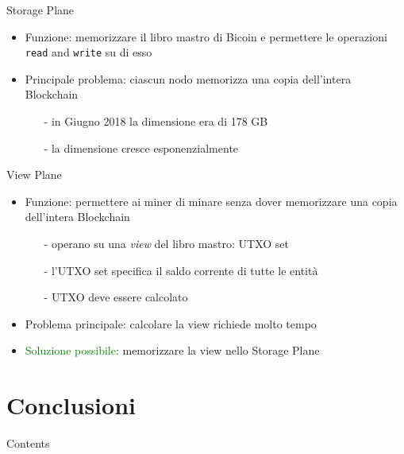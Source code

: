 \documentclass{beamer}
\begin{document}
  
  
  
  \begin{frame}{Storage Plane}
      \begin{itemize}
          \item Funzione: memorizzare il libro mastro di Bicoin e permettere le operazioni \texttt{read} and \texttt{write} su di esso
          \item Principale problema: ciascun nodo memorizza una copia dell'intera Blockchain
          \begin{itemize}
              \item[-] in Giugno 2018 la dimensione era di 178 GB \cite{statista}
              \item[-] la dimensione cresce esponenzialmente
          \end{itemize}
      \end{itemize}
  \end{frame}
  
  
  
  
  \begin{frame}{View Plane}
      \begin{itemize}
          \item Funzione: permettere ai miner di minare senza dover memorizzare una copia dell'intera Blockchain
          \begin{itemize}
              \item[-] operano su una \emph{view} del libro mastro: UTXO set
              \item[-] l'UTXO set specifica il saldo corrente di tutte le entità
              \item[-] UTXO deve essere calcolato
          \end{itemize}
          \item Problema principale: calcolare la view richiede molto tempo
          \item \textcolor{green}{Soluzione possibile}: memorizzare la view nello Storage Plane
      \end{itemize}
  \end{frame}
  
  
  
  
  \section{Conclusioni}
  \begin{frame}{Contents}
      \frametitle{\contentsname}
    \begin{multicols}{2}
    \end{multicols}
  \end{frame}
  
\end{document}
